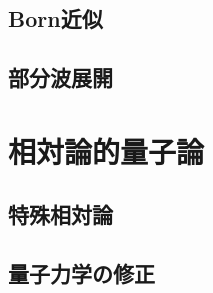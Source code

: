 \documentclass{report}
\begin{document}
    \section{Born近似}
      
    \section{部分波展開}
      
  \chapter{相対論的量子論}
    \section{特殊相対論}
      
    \section{量子力学の修正}
      
\end{document}
